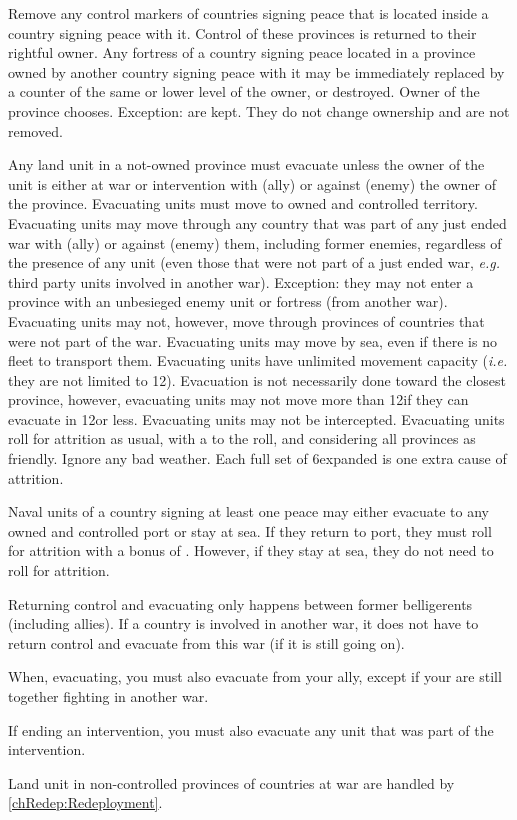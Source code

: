  Remove any control markers of countries signing
peace that is located inside a country signing peace with it. Control of these
provinces is returned to their rightful owner.
\bparag Any fortress of a country signing peace located in a province owned by
another country signing peace with it may be immediately replaced by a counter
of the same or lower level of the owner, or destroyed. Owner of the province
chooses.
\bparag Exception: \Presidios are kept. They do not change ownership and are
not removed.

\label{chPeace:Evacuation}
Any land unit in a not-owned province must evacuate unless the owner of the
unit is either at war or intervention with (ally) or against (enemy) the owner
of the province.
\bparag Evacuating units must move to owned and controlled territory.
\bparag Evacuating units may move through any country that was part of any
just ended war with (ally) or against (enemy) them, including former enemies,
regardless of the presence of any unit (even those that were not part of a
just ended war, \emph{e.g.} third party units involved in another war).
\bparag Exception: they may not enter a province with an unbesieged enemy unit
or fortress (from another war).
\bparag Evacuating units may not, however, move through provinces of countries
that were not part of the war.
\bparag Evacuating units may move by sea, even if there is no fleet to
transport them.
\bparag Evacuating units have unlimited movement capacity (\emph{i.e.} they
are not limited to 12\MP). Evacuation is not necessarily done toward the
closest province, however, evacuating units may not move more than 12\MP if
they can evacuate in 12\MP or less.
\bparag Evacuating units may not be intercepted.
\bparag Evacuating units roll for attrition as usual, with a  to the
roll, and considering all provinces as friendly. Ignore any bad weather. Each
full set of 6\MP expanded is one extra cause of attrition.

 Naval units of a country signing at least one peace
may either evacuate to any owned and controlled port or stay at sea.
\bparag If they return to port, they must roll for attrition with a bonus of
.
\bparag However, if they stay at sea, they do not need to roll for attrition.

\begin{designnote}
  Returning control and evacuating only happens between former belligerents
  (including allies). If a country is involved in another war, it does not
  have to return control and evacuate from this war (if it is still going
  on).

  When, evacuating, you must also evacuate from your ally, except if your are
  still together fighting in another war.

  If ending an intervention, you must also evacuate any unit that was part of
  the intervention.

  Land unit in non-controlled provinces of countries at war are handled by
  \ref{chRedep:Redeployment}.
\end{designnote}

